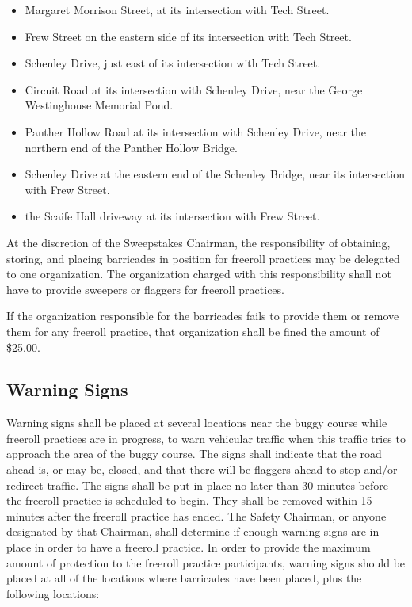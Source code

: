 	\begin{itemize}

		\item Margaret Morrison Street, at its intersection with Tech Street.

		\item Frew Street on the eastern side of its intersection with Tech
		Street.

		\item Schenley Drive, just east of its intersection with Tech Street.

		\item Circuit Road at its intersection with Schenley Drive, near the
		George Westinghouse Memorial Pond.

		\item Panther Hollow Road at its intersection with Schenley Drive, near
		the northern end of the Panther Hollow Bridge.

		\item Schenley Drive at the eastern end of the Schenley Bridge, near its
		intersection with Frew Street. 

		\item the Scaife Hall driveway at its intersection with Frew Street.

	\end{itemize}

	At the discretion of the Sweepstakes Chairman, the responsibility of obtaining,
	storing, and placing barricades in position for freeroll practices may be
	delegated to one organization. The organization charged with this
	responsibility shall not have to provide sweepers or flaggers for freeroll
	practices.

	If the organization responsible for the barricades fails to provide them or
	remove them for any freeroll practice, that organization shall be fined the
	amount of \$25.00.

\subsection{Warning Signs}

	Warning signs shall be placed at several locations near the buggy course while
	freeroll practices are in progress, to warn vehicular traffic when this traffic
	tries to approach the area of the buggy course. The signs shall indicate that
	the road ahead is, or may be, closed, and that there will be flaggers ahead to
	stop and/or redirect traffic. The signs shall be put in place no later than 30
	minutes before the freeroll practice is scheduled to begin. They shall be
	removed within 15 minutes after the freeroll practice has ended. The Safety
	Chairman, or anyone designated by that Chairman, shall determine if enough
	warning signs are in place in order to have a freeroll practice. In order to
	provide the maximum amount of protection to the freeroll practice participants,
	warning signs should be placed at all of the locations where barricades have
	been placed, plus the following locations:


